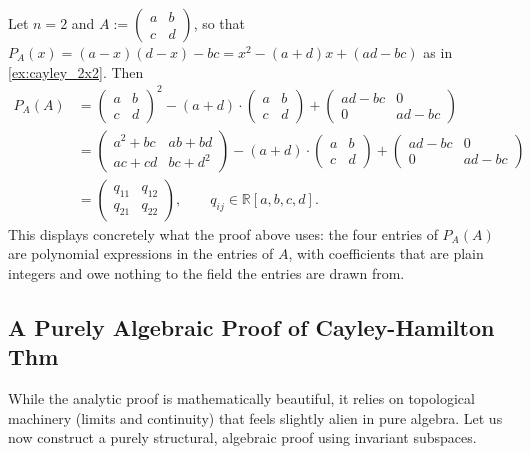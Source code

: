 \begin{example}[The Polynomials $q_{ij}$ for $n = 2$]\label{ex:q_ij_2x2}
  Let $n = 2$ and $A := \left(\begin{smallmatrix} a & b \\ c & d \end{smallmatrix}\right)$, so that $P_A(x) = (a-x)(d-x) - bc = x^2 - (a+d)x + (ad-bc)$ as in \cref{ex:cayley_2x2}. Then
  \begin{align*}
    P_A(A) &= \begin{pmatrix} a & b \\ c & d \end{pmatrix}^2 - (a+d) \cdot \begin{pmatrix} a & b \\ c & d \end{pmatrix} + \begin{pmatrix} ad-bc & 0 \\ 0 & ad-bc \end{pmatrix} \\
    &= \begin{pmatrix} a^2 + bc & ab+bd \\ ac+cd & bc+d^2 \end{pmatrix} - (a+d) \cdot \begin{pmatrix} a & b \\ c & d \end{pmatrix} + \begin{pmatrix} ad-bc & 0 \\ 0 & ad-bc \end{pmatrix} \\
    &= \begin{pmatrix} q_{11} & q_{12} \\ q_{21} & q_{22} \end{pmatrix}, \qquad q_{ij} \in \mathbb{R}[a,b,c,d].
  \end{align*}
  This displays concretely what the proof above uses: the four entries of $P_A(A)$ are polynomial expressions in the entries of $A$, with coefficients that are plain integers and owe nothing to the field the entries are drawn from.
\end{example}

\subsection*{A Purely Algebraic Proof of Cayley-Hamilton Thm}

While the analytic proof is mathematically beautiful, it relies on topological machinery (limits and continuity) that feels slightly alien in pure algebra. Let us now construct a purely structural, algebraic proof using invariant subspaces.


